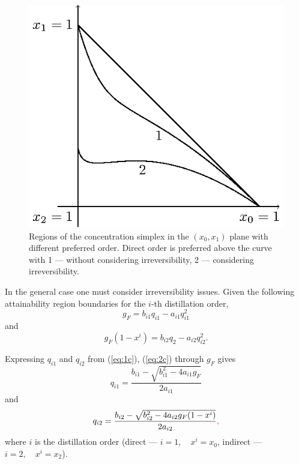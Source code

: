 \documentclass[12pt]{article}
\newcommand{\RED}[1]{\textcolor{red}{#1}}
\begin{document}
\begin{figure}[bth]
\centering
\includegraphics{pic5.eps}
\caption{Regions of the concentration simplex in the $(x_0,x_1)$ plane with different preferred order. Direct order is preferred above the curve with 1 --- without considering irreversibility, 2 --- considering irreversibility.}
\label{fig:pic5}
\end{figure}

In the general case one must consider irreversibility issues. Given the following attainability region boundaries for the $i$-th distillation order,
\begin{equation}
g_F = b_{i1} q_{i1} - a_{i1} q_{i1}^2
\label{eq:1c}
\end{equation}
and
\begin{equation}
g_F (1-x^i) = b_{i2} q_2 - a_{i2} q_{i2}^2.
\label{eq:2c}
\end{equation}

Expressing $q_{i1}$ and $q_{i2}$ from (\ref{eq:1c}), (\ref{eq:2c}) through $g_F$ gives
\begin{equation}
q_{i1} = \frac{b_{i1} - \sqrt{b_{i1}^2 - 4a_{i1}g_F}}{2a_{i1}}
\label{eq:1cq}
\end{equation}
and
\begin{equation}
q_{i2}= \frac{b_{i2} - \sqrt{b_{i2}^2 - 4a_{i2}g_F(1-x^i)}}{2a_{i2}}\RED{,}
\label{eq:2cq}
\end{equation}
where $i$ is the distillation order (direct --- $i=1,\quad x^i=x_0$, indirect --- $i=2,\quad x^i=x_2$).
 
\end{document}
